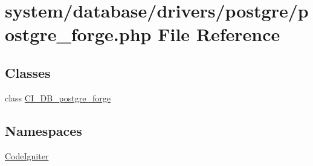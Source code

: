 \hypertarget{postgre__forge_8php}{}\section{system/database/drivers/postgre/postgre\+\_\+forge.php File Reference}
\label{postgre__forge_8php}
\subsection*{Classes}
\begin{DoxyCompactItemize}
\item 
class \mbox{\hyperlink{class_c_i___d_b__postgre__forge}{C\+I\+\_\+\+D\+B\+\_\+postgre\+\_\+forge}}
\end{DoxyCompactItemize}
\subsection*{Namespaces}
\begin{DoxyCompactItemize}
\item 
 \mbox{\hyperlink{namespace_code_igniter}{Code\+Igniter}}
\end{DoxyCompactItemize}
